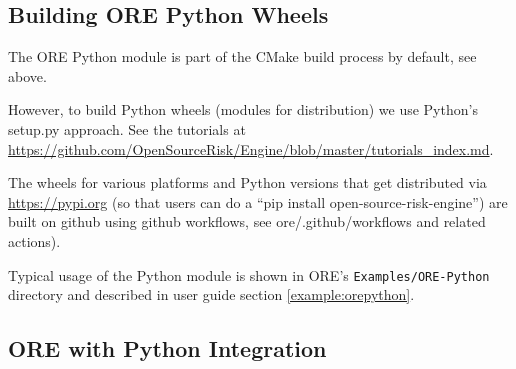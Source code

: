 
\subsection{Building ORE Python Wheels}\label{sec:oreswig}

The ORE Python module is part of the CMake build process by default, see above.

However, to build Python wheels (modules for distribution) we use Python's setup.py approach.
See the tutorials at \url{https://github.com/OpenSourceRisk/Engine/blob/master/tutorials_index.md}.

The wheels for various platforms and Python versions that get distributed via \url{https://pypi.org} (so that users can
do a ``pip install open-source-risk-engine'') are built on github using github workflows, see ore/.github/workflows and related actions).

\medskip
Typical usage of the Python module is shown in ORE's {\tt Examples/ORE-Python} directory and described in user guide section
\ref{example:orepython}.

\subsection{ORE with Python Integration}\label{sec:orepythonintegration}

